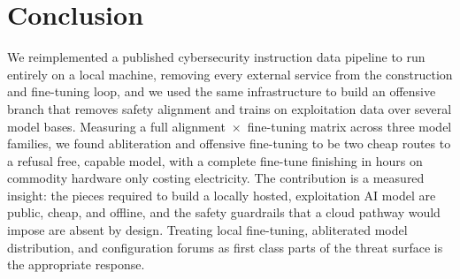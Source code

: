 \section{Conclusion}
\label{sec:conclusion}

We reimplemented a published cybersecurity instruction data pipeline to run
entirely on a local machine, removing every external service
from the construction and fine-tuning loop, and we used the same
infrastructure to build an offensive branch that removes safety alignment and
trains on exploitation data over several model bases. Measuring a full
alignment~$\times$~fine-tuning matrix across three model families, we found
abliteration and offensive fine-tuning to be two cheap routes to a
refusal free, capable model, with a complete fine-tune finishing in hours on
commodity hardware only costing electricity. The contribution is a
measured insight: the pieces required to build a locally hosted, exploitation
AI model are public, cheap, and offline, and the safety guardrails that a
cloud pathway would impose are absent by design. Treating local
fine-tuning, abliterated model distribution, and configuration forums as first class parts of the
threat surface is the appropriate response.
